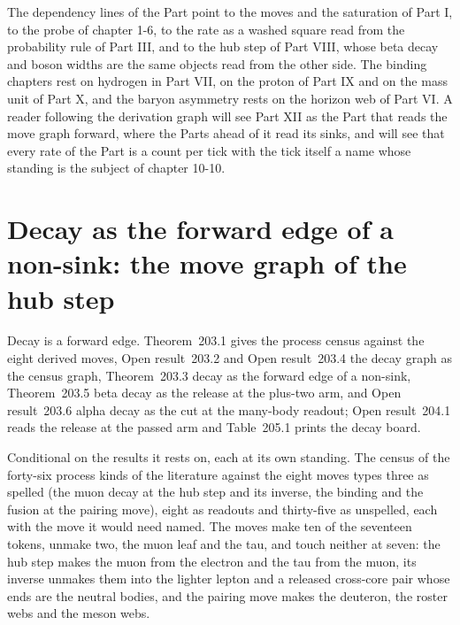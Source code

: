 The dependency lines of the Part point to the moves and the saturation of Part I, to the probe of chapter 1-6, to the rate as a washed square read from the probability rule of Part III, and to the hub step of Part VIII, whose beta decay and boson widths are the same objects read from the other side. The binding chapters rest on hydrogen in Part VII, on the proton of Part IX and on the mass unit of Part X, and the baryon asymmetry rests on the horizon web of Part VI. A reader following the derivation graph will see Part XII as the Part that reads the move graph forward, where the Parts ahead of it read its sinks, and will see that every rate of the Part is a count per tick with the tick itself a name whose standing is the subject of chapter 10-10.
\section{Decay as the forward edge of a non-sink: the move graph of the hub step}\label{mod:IX-1-decay-as-the-forward-edge-of-a-non-sink-the-move-graph-of-the-hub-step}
\label{narr:open:9-1}Decay is a forward edge. Theorem~203.1 gives the process census against the eight derived moves, Open result~203.2 and Open result~203.4 the decay graph as the census graph, Theorem~203.3 decay as the forward edge of a non-sink, Theorem~203.5 beta decay as the release at the plus-two arm, and Open result~203.6 alpha decay as the cut at the many-body readout; Open result~204.1 reads the release at the passed arm and Table~205.1 prints the decay board.
\begin{chconditional}\label{box:IX-1-decay-as-the-forward-edge-of-a-non-sink-the-move-graph-of-the-hub-step:1}
Conditional on the results it rests on, each at its own standing. The census of the forty-six process kinds of the literature against the eight moves types three as spelled (the muon decay at the hub step and its inverse, the binding and the fusion at the pairing move), eight as readouts and thirty-five as unspelled, each with the move it would need named. The moves make ten of the seventeen tokens, unmake two, the muon leaf and the tau, and touch neither at seven: the hub step makes the muon from the electron and the tau from the muon, its inverse unmakes them into the lighter lepton and a released cross-core pair whose ends are the neutral bodies, and the pairing move makes the deuteron, the roster webs and the meson webs.
\end{chconditional}
